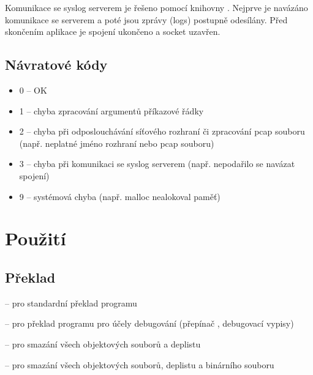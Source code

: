 \documentclass[11pt, a4paper, titlepage]{article}
\begin{document}
Komunikace se syslog serverem je řešeno pomocí knihovny . Nejprve je navázáno komunikace se serverem a poté jsou zprávy (logs) postupně odesílány. Před skončením aplikace je spojení ukončeno a socket uzavřen.
\bigskip



\subsection{Návratové kódy}

\begin{itemize}
	\item 0 -- OK
	\item 1 -- chyba zpracování argumentů příkazové řádky
	\item 2 -- chyba při odposlouchávání síťového rozhraní či zpracování pcap souboru (např. neplatné jméno rozhraní nebo pcap souboru)
	\item 3 -- chyba při komunikaci se syslog serverem (např. nepodařilo se navázat spojení)
	\item 9 -- systémová chyba (např. malloc nealokoval paměť)
\end{itemize}

\newpage






\section{Použití}

\subsection{Překlad}

\begin{description}
	\item {} -- pro standardní překlad programu
	\item {} -- pro překlad programu pro účely debugování (přepínač , debugovací vypisy)
	\item {} -- pro smazání všech objektových souborů a deplistu
	\item {} -- pro smazání všech objektových souborů, deplistu a binárního souboru
\end{description}
\smallskip
\end{document}
